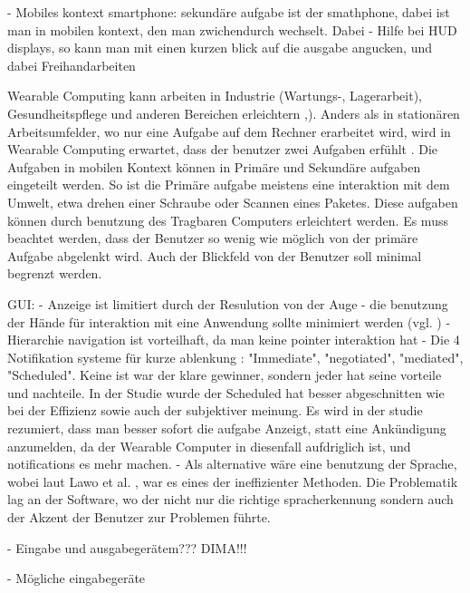 - Mobiles kontext smartphone: sekundäre aufgabe ist der smathphone, dabei ist man in mobilen kontext, den man zwichendurch wechselt. Dabei 
- Hilfe bei HUD displays, so kann man mit einen kurzen blick auf die ausgabe angucken, und dabei Freihandarbeiten

Wearable Computing kann arbeiten in Industrie (Wartungs-, Lagerarbeit), Gesundheitspflege und anderen Bereichen erleichtern \cite{Witt:2006hi},\cite{Lawo:2008gg}). Anders als in stationären Arbeitsumfelder, wo nur eine Aufgabe auf dem Rechner erarbeitet wird, wird in Wearable Computing erwartet, dass der benutzer zwei Aufgaben erfühlt \cite{Witt:2006hi}. Die Aufgaben in mobilen Kontext können in Primäre und Sekundäre aufgaben eingeteilt werden. So ist die Primäre aufgabe meistens eine interaktion mit dem Umwelt, etwa drehen einer Schraube oder Scannen eines Paketes. Diese aufgaben können durch benutzung des Tragbaren Computers erleichtert werden. Es muss beachtet werden, dass der Benutzer so wenig wie möglich von der primäre Aufgabe abgelenkt wird. Auch der Blickfeld von der Benutzer soll minimal begrenzt werden.

GUI: 
-  Anzeige ist limitiert durch der Resulution von der Auge \cite[Seite 60]{Starner:2001eu}
- die benutzung der Hände für interaktion mit eine Anwendung sollte minimiert werden (vgl. \cite{Rekimoto:gu})
- Hierarchie navigation ist vorteilhaft, da man keine pointer interaktion hat \cite{Blasko:ug}
- Die 4 Notifikation systeme für kurze ablenkung \cite{McFarlane:1999um}: "Immediate", "negotiated", "mediated", "Scheduled". Keine ist war der klare gewinner, sondern jeder hat seine vorteile und nachteile. In der Studie \cite{Nilsson:cq} wurde der Scheduled hat besser abgeschnitten wie bei der Effizienz sowie auch der subjektiver meinung. Es wird in der studie rezumiert, dass man besser sofort die aufgabe Anzeigt, statt eine Ankündigung anzumelden, da der Wearable Computer in diesenfall aufdriglich ist, und notifications es mehr machen.
- Als alternative wäre eine benutzung der Sprache, wobei laut Lawo et al. \cite{Lawo:2008gg}, war es eines der ineffizienter Methoden. Die Problematik lag an der Software, wo der nicht nur die richtige spracherkennung sondern auch der Akzent der Benutzer zur Problemen führte.

- Eingabe und ausgabegerätem??? DIMA!!!

- Mögliche eingabegeräte \cite{Witt:we}
